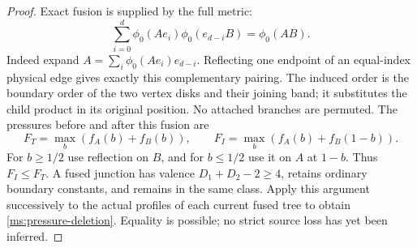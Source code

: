 \begin{proof}
Exact fusion is supplied by the full metric:
\begin{equation}\label{ms:fusion}
 \sum_{i=0}^d\phi_0(Ae_i)\phi_0(e_{d-i}B)=\phi_0(AB).
\end{equation}
Indeed expand $A=\sum_i\phi_0(Ae_i)e_{d-i}$. Reflecting one
endpoint of an equal-index physical edge gives exactly this
complementary pairing. The induced order is the boundary order of
the two vertex disks and their joining band; it substitutes the
child product in its original position. No attached branches are
permuted. The pressures before and after this fusion are
\[
 F_T=\max_b(f_A(b)+f_B(b)),\qquad
 F_I=\max_b(f_A(b)+f_B(1-b)).
\]
For $b\ge1/2$ use reflection on $B$, and for $b\le1/2$ use it
on $A$ at $1-b$. Thus $F_I\le F_T$. A fused junction has valence
$D_1+D_2-2\ge4$, retains ordinary boundary constants, and remains
in the same class. Apply this argument successively to the actual
profiles of each current fused tree to obtain
\eqref{ms:pressure-deletion}. Equality is possible; no strict
source loss has yet been inferred.
\end{proof}

